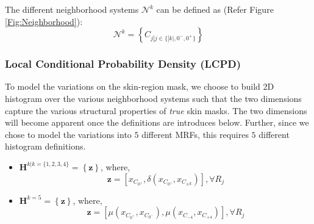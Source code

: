 \documentclass[times, 10pt,twocolumn]{article}
\begin{document}
The different neighborhood systems $\mathcal N^k$ can be defined as
(Refer Figure \ref{Fig:Neighborhood}):
\begin{equation}
\mathcal N^k = \left\{C_{j | j \in \{|k|, 0^-, 0^+\}}\right\}
\end{equation}

\subsubsection{Local Conditional Probability Density (LCPD)}\label{LCPD} To model the
variations on the skin-region mask, we choose to build 2D histogram
over the various neighborhood systems such that the two dimensions
capture the various structural properties of {\it true} skin masks.
The two dimensions will become apparent once the definitions are
introduces below. Further, since we chose to model the variations
into $5$ different MRFs, this requires $5$ different histogram
definitions.
\begin{itemize}
\item $\mathbf{H}^{k|k=\{1,2,3,4\}} = \left\{ \mathbf{z}\right\}$, where,
\begin{equation}\mathbf{z} = [x_{C_{0^{\pm}}}, \delta(x_{C_{0^{\pm}}},
x_{C_{\pm k}})] , \forall R_{j} \label{Eqn:9}
\end{equation}

\item$\mathbf{H}^{k=5} = \left\{
\mathbf{z}\right\}$, where,
\begin{equation}
\mathbf{z} = [\mu(x_{C_{0^+}},x_{C_{0^-}}), \mu(x_{C_{-4}},
x_{C_{+4}})] , \forall R_{j} \label{Eqn:10}
\end{equation}
\end{itemize}
\end{document}
